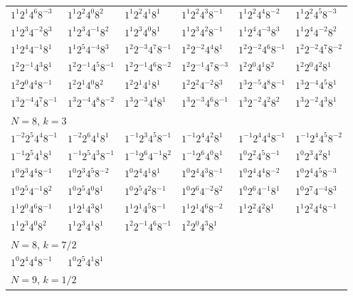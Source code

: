 \documentclass[12pt]{amsart}
\numberwithin{equation}{section}
\theoremstyle{plain}
\theoremstyle{definition}
\theoremstyle{remark}
\begin{document}
\begin{longtable}{llllll}
$1^{1}2^{1}4^{6}8^{-3}$ & $1^{1}2^{2}4^{0}8^{2}$ & $1^{1}2^{2}4^{1}8^{1}$ & $1^{1}2^{2}4^{3}8^{-1}$ & $1^{1}2^{2}4^{4}8^{-2}$ & $1^{1}2^{2}4^{5}8^{-3}$\\
$1^{1}2^{3}4^{-2}8^{3}$ & $1^{1}2^{3}4^{-1}8^{2}$ & $1^{1}2^{3}4^{0}8^{1}$ & $1^{1}2^{3}4^{2}8^{-1}$ & $1^{1}2^{4}4^{-3}8^{3}$ & $1^{1}2^{4}4^{-2}8^{2}$\\
$1^{1}2^{4}4^{-1}8^{1}$ & $1^{1}2^{5}4^{-4}8^{3}$ & $1^{2}2^{-3}4^{7}8^{-1}$ & $1^{2}2^{-2}4^{4}8^{1}$ & $1^{2}2^{-2}4^{6}8^{-1}$ & $1^{2}2^{-2}4^{7}8^{-2}$\\
$1^{2}2^{-1}4^{3}8^{1}$ & $1^{2}2^{-1}4^{5}8^{-1}$ & $1^{2}2^{-1}4^{6}8^{-2}$ & $1^{2}2^{-1}4^{7}8^{-3}$ & $1^{2}2^{0}4^{1}8^{2}$ & $1^{2}2^{0}4^{2}8^{1}$\\
$1^{2}2^{0}4^{4}8^{-1}$ & $1^{2}2^{1}4^{0}8^{2}$ & $1^{2}2^{1}4^{1}8^{1}$ & $1^{2}2^{2}4^{-2}8^{3}$ & $1^{3}2^{-5}4^{8}8^{-1}$ & $1^{3}2^{-4}4^{5}8^{1}$\\
$1^{3}2^{-4}4^{7}8^{-1}$ & $1^{3}2^{-4}4^{8}8^{-2}$ & $1^{3}2^{-3}4^{4}8^{1}$ & $1^{3}2^{-3}4^{6}8^{-1}$ & $1^{3}2^{-2}4^{2}8^{2}$ & $1^{3}2^{-2}4^{3}8^{1}$\\
\midrule
\multicolumn{6}{l}{$N=8$, $k=3$}\\
$1^{-2}2^{5}4^{4}8^{-1}$ & $1^{-2}2^{6}4^{1}8^{1}$ & $1^{-1}2^{3}4^{5}8^{-1}$ & $1^{-1}2^{4}4^{2}8^{1}$ & $1^{-1}2^{4}4^{4}8^{-1}$ & $1^{-1}2^{4}4^{5}8^{-2}$\\
$1^{-1}2^{5}4^{1}8^{1}$ & $1^{-1}2^{5}4^{3}8^{-1}$ & $1^{-1}2^{6}4^{-1}8^{2}$ & $1^{-1}2^{6}4^{0}8^{1}$ & $1^{0}2^{2}4^{5}8^{-1}$ & $1^{0}2^{3}4^{2}8^{1}$\\
$1^{0}2^{3}4^{4}8^{-1}$ & $1^{0}2^{3}4^{5}8^{-2}$ & $1^{0}2^{4}4^{1}8^{1}$ & $1^{0}2^{4}4^{3}8^{-1}$ & $1^{0}2^{4}4^{4}8^{-2}$ & $1^{0}2^{4}4^{5}8^{-3}$\\
$1^{0}2^{5}4^{-1}8^{2}$ & $1^{0}2^{5}4^{0}8^{1}$ & $1^{0}2^{5}4^{2}8^{-1}$ & $1^{0}2^{6}4^{-2}8^{2}$ & $1^{0}2^{6}4^{-1}8^{1}$ & $1^{0}2^{7}4^{-4}8^{3}$\\
$1^{1}2^{0}4^{6}8^{-1}$ & $1^{1}2^{1}4^{3}8^{1}$ & $1^{1}2^{1}4^{5}8^{-1}$ & $1^{1}2^{1}4^{6}8^{-2}$ & $1^{1}2^{2}4^{2}8^{1}$ & $1^{1}2^{2}4^{4}8^{-1}$\\
$1^{1}2^{3}4^{0}8^{2}$ & $1^{1}2^{3}4^{1}8^{1}$ & $1^{2}2^{-1}4^{6}8^{-1}$ & $1^{2}2^{0}4^{3}8^{1}$ & &\\
\midrule
\multicolumn{6}{l}{$N=8$, $k=7/2$}\\
$1^{0}2^{4}4^{4}8^{-1}$ & $1^{0}2^{5}4^{1}8^{1}$ & &&&\\
\midrule
\multicolumn{6}{l}{$N=9$, $k=1/2$}\\

\end{longtable}
\end{document}
